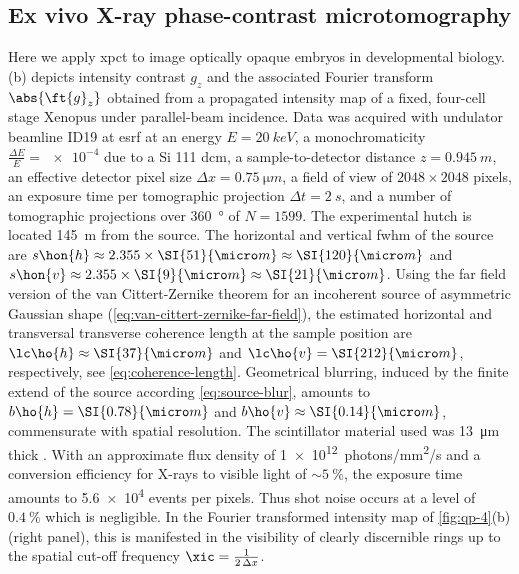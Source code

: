 \documentclass[
twoside,
openright,
titlepage,
numbers=noenddot,
headinclude,
fleqn,
a4paper,
footinclude=true,
cleardoublepage=empty,
abstractoff,
BCOR=5mm,
paper=a4,
fontsize=11pt,
british,ngerman,american,
]{scrreprt}
\begin{document}
\subsection[\texorpdfstring{Ex vivo X-ray phase-contrast\\
  microtomography}{Ex vivo X-ray phase-contrast microtomography}]{Ex
  vivo X-ray phase-contrast microtomography}
\label{sec:qp-tomo-exvivo}

Here we apply \ac{xpct} to image optically opaque embryos in
developmental biology.  (b) depicts intensity contrast
$g_z$ and the associated Fourier transform $\abs{\ft{g}_z}$ obtained
from a propagated intensity map of a fixed, four-cell stage Xenopus
under parallel-beam incidence.  Data was acquired with undulator
beamline ID19 at \ac{esrf} at an energy $E=\SI{20}{keV}$, a
monochromaticity $\frac{\Delta E}{E}=\num{e-4}$ due to a Si 111
\acf{dcm}, a sample-to-detector distance $z=\SI{0.945}{m}$, an
effective detector pixel size $\Delta x = \SI{0.75}{\micro m}$, a
field of view of $2048\times2048$ pixels, an exposure time per
tomographic projection $\Delta t = \SI{2}{s}$, and a number of
tomographic projections over \SI{360}{\degree} of $N=1599$.  The
experimental hutch is located \SI{145}{m} from the source.  The
horizontal and vertical \ac{fwhm} of the source are $s\hon{h}\approx
2.355\times\SI{51}{\micro m}\approx\SI{120}{\micro m}$ and
$s\hon{v}\approx 2.355\times\SI{9}{\micro m}\approx\SI{21}{\micro m}$.
Using the far field version of the van Cittert-Zernike theorem for an
incoherent source of asymmetric Gaussian shape
(\cref{eq:van-cittert-zernike-far-field}), the estimated horizontal
and transversal transverse coherence length at the sample position are
$\lc\ho{h}\approx\SI{37}{\micro m}$ and $\lc\ho{v}=\SI{212}{\micro
  m}$, respectively, see \cref{eq:coherence-length}. Geometrical
blurring, induced by the finite extend of the source according
\cref{eq:source-blur}, amounts to $b\ho{h}=\SI{0.78}{\micro m}$ and
$b\ho{v}\approx\SI{0.14}{\micro m}$, commensurate with spatial
resolution.  The scintillator material used was \SI{13}{\micro m}
thick .  With an approximate flux density of
\SI{1e12}{photons/mm^2/s} and a conversion efficiency for X-rays to
visible light of $\sim\SI{5}{\percent}$, the exposure time amounts to
\num{5.6e4} events per pixels.  Thus shot noise occurs at a level of
$\SI{0.4}{\percent}$ which is negligible.  In the Fourier transformed
intensity map of \cref{fig:qp-4}(b) (right panel), this is manifested
in the visibility of clearly discernible rings up to the spatial
cut-off frequency $\xic=\frac{1}{2\,\Delta x}$.
\end{document}
